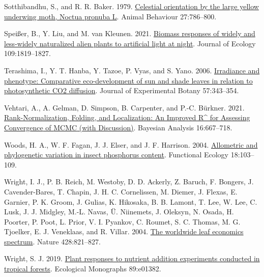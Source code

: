 \documentclass[
  12pt,
  letterpaper,
  DIV=11,
  numbers=noendperiod]{scrartcl}
\newlength{\cslhangindent}
\newlength{\cslentryspacingunit} %
\newenvironment{CSLReferences}[2] %
 {%
  \setlength{\parindent}{0pt}
  \ifodd #1
  \let\oldpar\par
  \def\par{\hangindent=\cslhangindent\oldpar}
  \fi
  \setlength{\parskip}{#2\cslentryspacingunit}
 }%
 {}
\begin{document}
\begin{CSLReferences}{1}{0}
\leavevmode{}%
Sotthibandhu, S., and R. R. Baker. 1979.
\href{https://doi.org/10.1016/0003-3472(79)90015-0}{Celestial
orientation by the large yellow underwing moth, {Noctua} pronuba {L}}.
Animal Behaviour 27:786--800.

\leavevmode{}%
Speißer, B., Y. Liu, and M. van Kleunen. 2021.
\href{https://doi.org/10.1111/1365-2745.13607}{Biomass responses of
widely and less-widely naturalized alien plants to artificial light at
night}. Journal of Ecology 109:1819--1827.

\leavevmode{}%
Terashima, I., Y. T. Hanba, Y. Tazoe, P. Vyas, and S. Yano. 2006.
\href{https://doi.org/10.1093/jxb/erj014}{Irradiance and phenotype:
Comparative eco-development of sun and shade leaves in relation to
photosynthetic {CO2} diffusion}. Journal of Experimental Botany
57:343--354.

\leavevmode{}%
Vehtari, A., A. Gelman, D. Simpson, B. Carpenter, and P.-C. Bürkner.
2021. \href{https://doi.org/10.1214/20-BA1221}{Rank-{Normalization},
{Folding}, and {Localization}: {An Improved R\^{}} for {Assessing
Convergence} of {MCMC} (with {Discussion})}. Bayesian Analysis
16:667--718.

\leavevmode{}%
Woods, H. A., W. F. Fagan, J. J. Elser, and J. F. Harrison. 2004.
\href{https://doi.org/10.1111/j.1365-2435.2004.00823.x}{Allometric and
phylogenetic variation in insect phosphorus content}. Functional Ecology
18:103--109.

\leavevmode{}%
Wright, I. J., P. B. Reich, M. Westoby, D. D. Ackerly, Z. Baruch, F.
Bongers, J. Cavender-Bares, T. Chapin, J. H. C. Cornelissen, M. Diemer,
J. Flexas, E. Garnier, P. K. Groom, J. Gulias, K. Hikosaka, B. B.
Lamont, T. Lee, W. Lee, C. Lusk, J. J. Midgley, M.-L. Navas, Ü.
Niinemets, J. Oleksyn, N. Osada, H. Poorter, P. Poot, L. Prior, V. I.
Pyankov, C. Roumet, S. C. Thomas, M. G. Tjoelker, E. J. Veneklaas, and
R. Villar. 2004. \href{https://doi.org/10.1038/nature02403}{The
worldwide leaf economics spectrum}. Nature 428:821--827.

\leavevmode{}%
Wright, S. J. 2019. \href{https://doi.org/10.1002/ecm.1382}{Plant
responses to nutrient addition experiments conducted in tropical
forests}. Ecological Monographs 89:e01382.


\end{CSLReferences}
\end{document}
